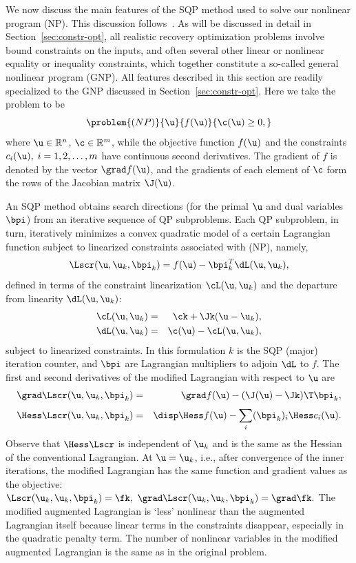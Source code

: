 
We now discuss the main features of the SQP method used to solve our
nonlinear program (NP). This discussion follows~\cite{SNOPT}. As will be discussed in detail in Section~\ref{sec:constr-opt}, all realistic recovery optimization problems involve bound constraints on the inputs, and often several other linear or nonlinear equality or inequality constraints, which together constitute a so-called general nonlinear program (GNP). All features described in this section are readily specialized to the GNP discussed in Section~\ref{sec:constr-opt}. Here we take the problem to be
$$
   \problem{(NP)}{\u}{f(\u)}{\c(\u) \ge 0,}
$$
where $\u \in \mathbb R^n$, $\c \in \mathbb R^m$, while the objective function $f(\u)$ and the constraints $c_i(\u), \; i=1,2,\ldots,m$
have continuous second derivatives. The gradient of $f$ is denoted
by the vector 
$\grad f(\u)$, 
and the gradients of each element of $\c$ form
the rows of the Jacobian matrix $\J(\u)$.

An SQP method obtains search directions (for the primal $\u$ and dual variables $\bpi$) from an iterative sequence of QP subproblems. Each QP subproblem, in turn, iteratively minimizes a convex quadratic
model of a certain Lagrangian function subject to
linearized constraints associated with (NP), namely,
\begin{equation}                                 \label{eqn-def-ML}
        \Lscr(\u,\u_k,\bpi_k) = f(\u) - \bpi_k^T \dL(\u,\u_k),
\end{equation}
defined in terms of the constraint linearization $\cL(\u,\u_k)$
and the departure from linearity $\dL(\u,\u_k)$:
\begin{eqnarray*}
        \cL(\u,\u_k) &=& \ck  + \Jk(\u - \u_k),
     \\ \dL(\u,\u_k) &=& \c(\u) - \cL(\u,\u_k),
\end{eqnarray*}
subject to linearized constraints. In this formulation $k$ is the SQP (major) iteration counter, and $\bpi$ are Lagrangian multipliers to adjoin $\dL$ to $f$. The first and second derivatives of the modified Lagrangian with
respect to $\u$ are
\begin{eqnarray*}
        \grad\Lscr(\u,\u_k,\bpi_k) &=& \grad f(\u) - (\J(\u) - \Jk)\T \bpi_k, \\[3pt]
        \Hess\Lscr(\u,\u_k,\bpi_k) &=& \disp \Hess f(\u)
                                           - \sum_i (\bpi_k)_i \Hess c_i(\u).
\end{eqnarray*}
Observe that $\Hess\Lscr$ is independent of $\u_k$
and is the same as the Hessian of the conventional Lagrangian.
At $\u = \u_k$, i.e., after convergence of the inner iterations, the modified Lagrangian has the same function and
gradient values as the objective:
$
           \Lscr(\u_k,\u_k,\bpi_k) = \fk, \ %
     \grad \Lscr(\u_k,\u_k,\bpi_k) = \grad \fk.
$
The modified augmented Lagrangian is `less' nonlinear than the augmented Lagrangian itself
because linear terms in the constraints disappear, especially in the quadratic penalty term.
The number of nonlinear variables in the modified augmented Lagrangian is the same as in the original problem.

